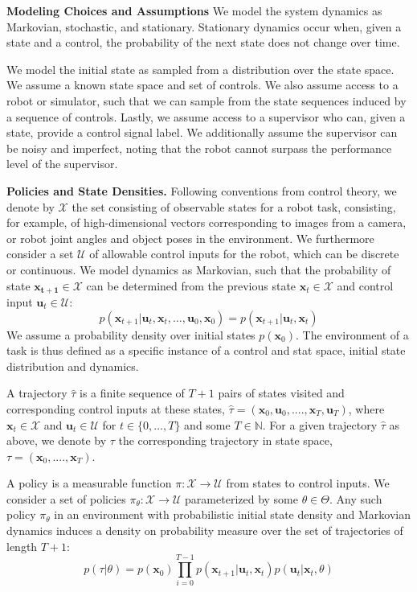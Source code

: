 \documentclass[10pt, conference]{ieeeconf}      %
\newcommand{\bu}{\mathbf{u}}
\newcommand{\bx}{\mathbf{x}}
\begin{document}
\noindent\textbf{Modeling Choices and Assumptions}  We model the system dynamics as Markovian, stochastic, and stationary. Stationary dynamics occur when, given a state and a control, the probability of the next state does not change over time. 

We model the initial state as sampled from a distribution over the state space.
We assume a known state space and set of controls. We also assume access to a robot or simulator, such that we  can sample from the state sequences induced by a sequence of controls.   Lastly, we assume access to a supervisor who can, given a state, provide a control signal label. We additionally assume the supervisor can be noisy and imperfect, noting that the robot cannot surpass the performance level of the supervisor. 



\noindent\textbf{Policies and State Densities.}
Following conventions from control theory, we denote by $\mathcal{X}$ the set consisting of observable states for a robot task, consisting, for example, of 
high-dimensional vectors corresponding to images from a camera, or robot joint angles and object poses in the environment.
We furthermore consider a set $\mathcal{U}$ of allowable control inputs for the robot, which can be discrete or
continuous. We model dynamics as Markovian, such that the probability of state $\mathbf{x_{t+1}}\in
\mathcal{X}$ can be determined from the previous state $\mathbf{x}_t\in\mathcal{X}$ and control input $\mathbf{u}_t\in
\mathcal{U}$: 
$$p(\bx_{t+1}|\bu_{t},\bx_{t}, \ldots, \bu_{0}, \bx_{0})=p(\bx_{t+1}|\bu_{t}, \bx_t)$$
We assume a probability density over initial states $p(\bx_0)$. The environment of a task is thus defined as a specific instance of a control and stat space, initial state distribution and dynamics. 



A trajectory $\hat{\tau}$ is a finite sequence of $T+1$ pairs of states visited and corresponding
control inputs at these states, $\hat{\tau} = (\mathbf{x}_0,\mathbf{u}_0, ...., \mathbf{x}_T,\mathbf{u}_T)$, where $\bx_t\in \mathcal{X}$
and $\bu_t\in \mathcal{U}$ for $t\in \{0, \ldots, T\}$ and some $T\in \mathbb{N}$.  
For a given trajectory $\hat{\tau}$ as above, we denote by ${\tau}$ the corresponding trajectory in state space,
${\tau} = (\bx_0,....,\bx_T)$.


A policy is a measurable function $\pi: \mathcal{X} \to \mathcal{U}$ from states to control inputs. 
We consider a set of policies $\pi_{\theta}:\mathcal{X}\to \mathcal{U}$ parameterized by some $\theta\in \Theta$. Any such policy $\pi_{\theta}$ in an environment with probabilistic initial state density and Markovian dynamics
induces a density on probability measure over the set of  trajectories of length $T+1$: $$p(\tau | \theta)=
p(\bx_0)\prod_{i=0}^{T-1}p(\bx_{t+1}|\bu_t,\bx_t)p(\bu_t|\bx_t,\theta)$$
\end{document}
